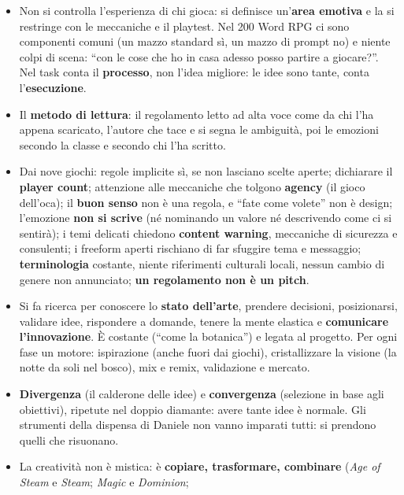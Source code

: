 \begin{itemize}
  \item Non si controlla l'esperienza di chi gioca: si definisce un'\textbf{area
        emotiva} e la si restringe con le meccaniche e il playtest. Nel 200 Word RPG
        ci sono componenti comuni (un mazzo standard sì, un mazzo di prompt no) e
        niente colpi di scena: ``con le cose che ho in casa adesso posso partire a
        giocare?''. Nel task conta il \textbf{processo}, non l'idea migliore: le idee
        sono tante, conta l'\textbf{esecuzione}.
  \item Il \textbf{metodo di lettura}: il regolamento letto ad alta voce come da chi
        l'ha appena scaricato, l'autore che tace e si segna le ambiguità, poi le
        emozioni secondo la classe e secondo chi l'ha scritto.
  \item Dai nove giochi: regole implicite sì, se non lasciano scelte aperte; dichiarare
        il \textbf{player count}; attenzione alle meccaniche che tolgono
        \textbf{agency} (il gioco dell'oca); il \textbf{buon senso} non è una regola,
        e ``fate come volete'' non è design; l'emozione \textbf{non si scrive} (né
        nominando un valore né descrivendo come ci si sentirà); i temi delicati
        chiedono \textbf{content warning}, meccaniche di sicurezza e consulenti; i
        freeform aperti rischiano di far sfuggire tema e messaggio;
        \textbf{terminologia} costante, niente riferimenti culturali locali, nessun
        cambio di genere non annunciato; \textbf{un regolamento non è un pitch}.
  \item Si fa ricerca per conoscere lo \textbf{stato dell'arte}, prendere decisioni,
        posizionarsi, validare idee, rispondere a domande, tenere la mente elastica e
        \textbf{comunicare l'innovazione}. È costante (``come la botanica'') e legata
        al progetto. Per ogni fase un motore: ispirazione (anche fuori dai giochi),
        cristallizzare la visione (la notte da soli nel bosco), mix e remix,
        validazione e mercato.
  \item \textbf{Divergenza} (il calderone delle idee) e \textbf{convergenza}
        (selezione in base agli obiettivi), ripetute nel doppio diamante: avere tante
        idee è normale. Gli strumenti della dispensa di Daniele non vanno imparati
        tutti: si prendono quelli che risuonano.
  \item La creatività non è mistica: è \textbf{copiare, trasformare, combinare}
        (\emph{Age of Steam} e \emph{Steam}; \emph{Magic} e \emph{Dominion};

\end{itemize}
